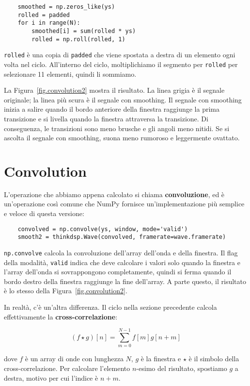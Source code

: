 \documentclass[12pt]{book} \usepackage[width=5.5in,height=8.5in, hmarginratio=3:2,vmarginratio=1:1]{geometry}
\begin{document}
\begin{verbatim} 
    smoothed = np.zeros_like(ys)
    rolled = padded
    for i in range(N):
        smoothed[i] = sum(rolled * ys)
        rolled = np.roll(rolled, 1)
 \end{verbatim} 

{\tt rolled} è una copia di {\tt padded} che viene spostata a destra di un elemento ogni volta nel ciclo. All'interno del ciclo, moltiplichiamo il segmento per {\tt rolled} per selezionare 11 elementi, quindi li sommiamo.

La Figura~\ref{fig.convolution2} mostra il risultato. La linea grigia è il segnale originale; la linea più scura è il segnale con smoothing. Il segnale con smoothing inizia a salire quando il bordo anteriore della finestra raggiunge la prima transizione e si livella quando la finestra attraversa la transizione. Di conseguenza, le transizioni sono meno brusche e gli angoli meno nitidi. Se si ascolta il segnale con smoothing, suona meno rumoroso e leggermente ovattato.

\section{Convolution} \label{convolution} 

L'operazione che abbiamo appena calcolato si chiama {\bf convoluzione}, ed è un'operazione così comune che NumPy fornisce un'implementazione più semplice e veloce di questa versione:

\begin{verbatim} 
    convolved = np.convolve(ys, window, mode='valid')
    smooth2 = thinkdsp.Wave(convolved, framerate=wave.framerate)
 \end{verbatim} 

{\tt np.convolve} calcola la convoluzione dell'array dell'onda e della finestra. Il flag della modalità, {\tt valid} indica che deve calcolare i valori solo quando la finestra e l'array dell'onda si sovrappongono completamente, quindi si ferma quando il bordo destro della finestra raggiunge la fine dell'array. A parte questo, il risultato è lo stesso della Figura~\ref{fig.convolution2}.

\newcommand{\conv}{\ast}

In realtà, c'è un'altra differenza. Il ciclo nella sezione precedente calcola effettivamente la {\bf cross-correlazione}:

%
\[ (f \star g)[n] = \sum_{m=0}^{N-1} f[m] g[n+m] \] 

%
dove $f$ è un array di onde con lunghezza $N$, $g$ è la finestra e $\star$ è il simbolo della cross-correlazione. Per calcolare l'elemento $n$-esimo del risultato, spostiamo $g$ a destra, motivo per cui l'indice è $n+m$.
\end{document}
